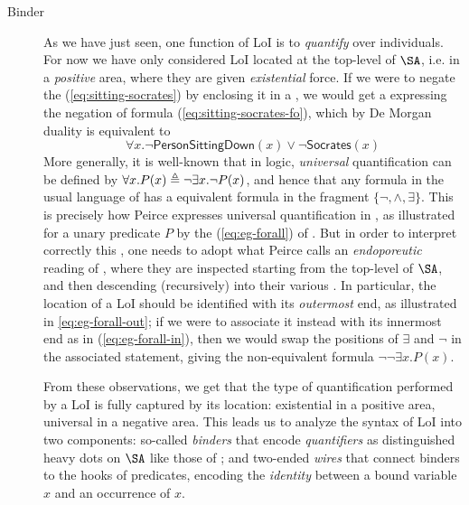\begin{scope}
\begin{description}
  \item[Binder] As we have just seen, one function of LoI is to \emph{quantify}
  over individuals. For now we have only considered LoI located at the top-level
  of $\SA$, i.e. in a \emph{positive} area, where they are given
  \emph{existential} force. If we were to negate the 
  (\ref{eq:sitting-socrates}) by enclosing it in a , we would get a 
  expressing the negation of formula (\ref{eq:sitting-socrates-fo}), which by De
  Morgan duality is equivalent to
  $$\forall x. \neg \mathsf{PersonSittingDown}(x) \vee \neg
  \mathsf{Socrates}(x)$$
  More generally, it is well-known that in  logic, \emph{universal}
  quantification can be defined  by $\forall x. P(x) \triangleq \neg
  \exists x. \neg P(x)$, and hence that any formula in the usual language of 
  has a  equivalent formula in the fragment $\{\neg, \land,
  \exists\}$. This is precisely how Peirce expresses universal quantification in
  , as illustrated for a unary predicate $P$ by the 
  (\ref{eq:eg-forall}) of . But in order to interpret
  correctly this , one needs to adopt what Peirce calls an
  \emph{endoporeutic} reading of , where they are inspected starting from the top-level
  of $\SA$, and then descending (recursively) into their various . In
  particular, the location of a LoI should be identified with its
  \emph{outermost} end, as illustrated in  \ref{eq:eg-forall-out}; if we
  were to associate it instead with its innermost end as in 
  (\ref{eq:eg-forall-in}), then we would swap the positions of $\exists$ and
  $\neg$ in the associated statement, giving the non-equivalent formula $\neg
  \neg \exists x. P(x)$.

  From these observations, we get that the type of quantification performed by a
  LoI is fully captured by its location: existential in a positive area,
  universal in a negative area. This leads us to analyze the syntax of LoI into
  two components: so-called \emph{binders} that encode \emph{quantifiers} as
  distinguished heavy dots on $\SA$ like those of
  ; and two-ended \emph{wires} that connect binders to the hooks of
  predicates, encoding the \emph{identity} between a bound variable $x$ and an
  occurrence of $x$.
  

\end{description}
\end{scope}
